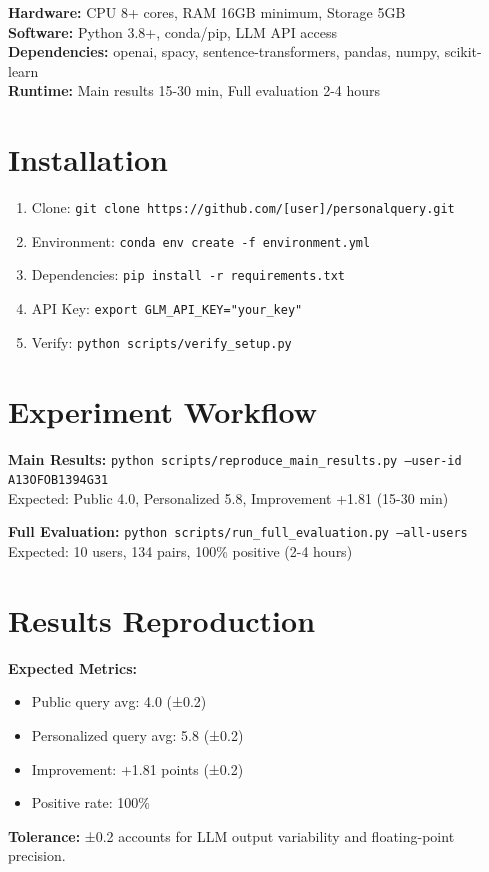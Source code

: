 \documentclass[11pt]{article}
\begin{document}
\textbf{Hardware:} CPU 8+ cores, RAM 16GB minimum, Storage 5GB\\
\textbf{Software:} Python 3.8+, conda/pip, LLM API access\\
\textbf{Dependencies:} openai, spacy, sentence-transformers, pandas, numpy, scikit-learn\\
\textbf{Runtime:} Main results 15-30 min, Full evaluation 2-4 hours

\section{Installation}

\begin{enumerate}
\item Clone: \texttt{git clone https://github.com/[user]/personalquery.git}
\item Environment: \texttt{conda env create -f environment.yml}
\item Dependencies: \texttt{pip install -r requirements.txt}
\item API Key: \texttt{export GLM\_API\_KEY="your\_key"}
\item Verify: \texttt{python scripts/verify\_setup.py}
\end{enumerate}

\section{Experiment Workflow}

\textbf{Main Results:} \texttt{python scripts/reproduce\_main\_results.py --user-id A13OFOB1394G31}\\
Expected: Public 4.0, Personalized 5.8, Improvement +1.81 (15-30 min)

\textbf{Full Evaluation:} \texttt{python scripts/run\_full\_evaluation.py --all-users}\\
Expected: 10 users, 134 pairs, 100\% positive (2-4 hours)

\section{Results Reproduction}

\textbf{Expected Metrics:}
\begin{itemize}
\item Public query avg: 4.0 (±0.2)
\item Personalized query avg: 5.8 (±0.2)
\item Improvement: +1.81 points (±0.2)
\item Positive rate: 100\%
\end{itemize}

\textbf{Tolerance:} ±0.2 accounts for LLM output variability and floating-point precision.
\end{document}
